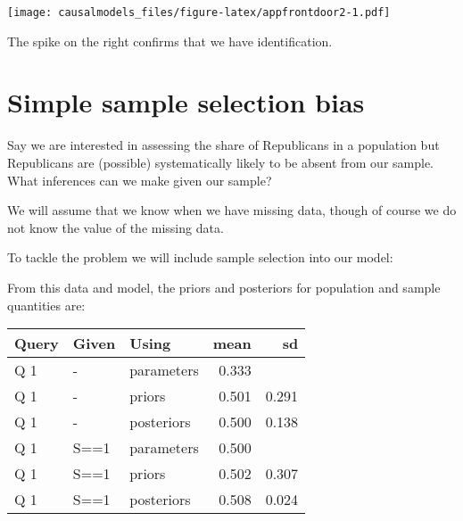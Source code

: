 \documentclass[
  12pt,
]{book}
\newenvironment{Shaded}{\begin{snugshade}}{\end{snugshade}}
\newcommand{\DataTypeTok}[1]{\textcolor[rgb]{0.13,0.29,0.53}{#1}}
\newcommand{\DecValTok}[1]{\textcolor[rgb]{0.00,0.00,0.81}{#1}}
\newcommand{\KeywordTok}[1]{\textcolor[rgb]{0.13,0.29,0.53}{\textbf{#1}}}
\newcommand{\NormalTok}[1]{#1}
\newcommand{\OperatorTok}[1]{\textcolor[rgb]{0.81,0.36,0.00}{\textbf{#1}}}
\newcommand{\OtherTok}[1]{\textcolor[rgb]{0.56,0.35,0.01}{#1}}
\newcommand{\StringTok}[1]{\textcolor[rgb]{0.31,0.60,0.02}{#1}}
\begin{document}
\texttt{[image: causalmodels\_files/figure-latex/appfrontdoor2-1.pdf]}

The spike on the right confirms that we have identification.

\hypertarget{simple-sample-selection-bias}{%
\section{Simple sample selection bias}\label{simple-sample-selection-bias}}

Say we are interested in assessing the share of Republicans in a population but Republicans are (possible) systematically likely to be absent from our sample. What inferences can we make given our sample?

We will assume that we know when we have missing data, though of course we do not know the value of the missing data.

To tackle the problem we will include sample selection into our model:

\begin{Shaded}
\end{Shaded}

From this data and model, the priors and posteriors for population and sample quantities are:

\begin{tabular}{l|l|l|r|r}
\hline
Query & Given & Using & mean & sd\\
\hline
Q 1 & - & parameters & 0.333 & \\
\hline
Q 1 & - & priors & 0.501 & 0.291\\
\hline
Q 1 & - & posteriors & 0.500 & 0.138\\
\hline
Q 1 & S==1 & parameters & 0.500 & \\
\hline
Q 1 & S==1 & priors & 0.502 & 0.307\\
\hline
Q 1 & S==1 & posteriors & 0.508 & 0.024\\
\hline
\end{tabular}
\end{document}
